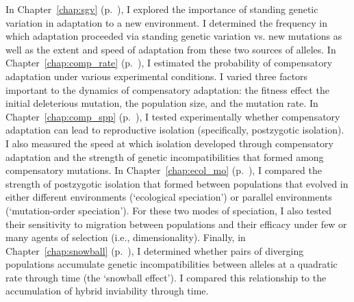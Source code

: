 \begin{doublespace}
In Chapter~\ref{chap:sgv} (p.~\pageref{chap:sgv}),
I explored the importance of standing genetic variation
in adaptation to a new environment.
%
I determined the frequency in which adaptation
proceeded via standing genetic variation vs. new mutations
as well as the extent and speed of adaptation
from these two sources of alleles.
%
In Chapter~\ref{chap:comp_rate} (p.~\pageref{chap:comp_rate}),
I estimated the probability of compensatory adaptation
under various experimental conditions.
%
I varied three factors important to the dynamics of compensatory adaptation:
the fitness effect the initial deleterious mutation,
the population size, and the mutation rate.
%
In Chapter~\ref{chap:comp_spp} (p.~\pageref{chap:comp_spp}),
I tested experimentally whether compensatory adaptation
can lead to reproductive isolation (specifically, postzygotic isolation).
%
I also measured the speed at which isolation developed
through compensatory adaptation and the strength of genetic incompatibilities
that formed among compensatory mutations.
%
In Chapter~\ref{chap:ecol_mo} (p.~\pageref{chap:ecol_mo}),
I compared the strength of postzygotic isolation that formed
between populations that evolved in either different environments
(`ecological speciation') or parallel environments
(`mutation-order speciation').
%
For these two modes of speciation,
I also tested their sensitivity to migration between populations
and their efficacy under few or many agents of selection (i.e., dimensionality).
%
Finally, in Chapter~\ref{chap:snowball} (p.~\pageref{chap:snowball}),
I determined whether pairs of diverging populations accumulate
genetic incompatibilities between alleles at a quadratic rate through time
(the `snowball effect').
%
I compared this relationship to the accumulation of hybrid inviability
through time.

\end{doublespace}
